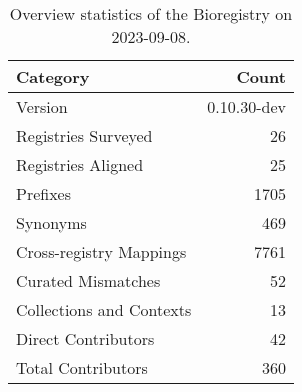 \begin{table}
\caption{Overview statistics of the Bioregistry on 2023-09-08.}
\label{tab:bioregistry-summary}
\begin{tabular}{lr}
\toprule
Category & Count \\
\midrule
Version & 0.10.30-dev \\
Registries Surveyed & 26 \\
Registries Aligned & 25 \\
Prefixes & 1705 \\
Synonyms & 469 \\
Cross-registry Mappings & 7761 \\
Curated Mismatches & 52 \\
Collections and Contexts & 13 \\
Direct Contributors & 42 \\
Total Contributors & 360 \\
\bottomrule
\end{tabular}
\end{table}
